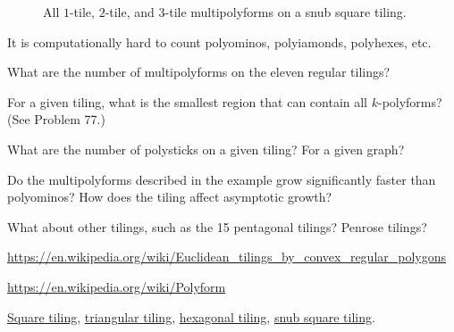 \documentclass{article}
\begin{document}
\begin{figure}[ht!]
  \caption{
    All $1$-tile, $2$-tile, and $3$-tile multipolyforms on a snub square tiling.
  }
\end{figure}
\begin{note}
  It is computationally hard to count polyominos, polyiamonds, polyhexes, etc.
\end{note}
\begin{question}
  What are the number of multipolyforms on the eleven regular tilings?
\end{question}

\begin{related}
  \item For a given tiling, what is the smallest region that can
  contain all $k$-polyforms? (See Problem 77.)
  \item What are the number of polysticks on a given tiling? For a given graph?
  \item Do the multipolyforms described in the example grow significantly
  faster than polyominos? How does the tiling affect asymptotic growth?
  \item What about other tilings, such as the 15 pentagonal tilings? Penrose
  tilings?
\end{related}
\begin{references}
  \item \url{https://en.wikipedia.org/wiki/Euclidean_tilings_by_convex_regular_polygons}
  \item \url{https://en.wikipedia.org/wiki/Polyform}
  \item \href{https://oeis.org/A000105}{Square tiling},
    \href{https://oeis.org/A000577}{triangular tiling},
    \href{https://oeis.org/A000228}{hexagonal tiling},
    \href{https://oeis.org/A309159}{snub square tiling}.
\end{references}
\end{document}
